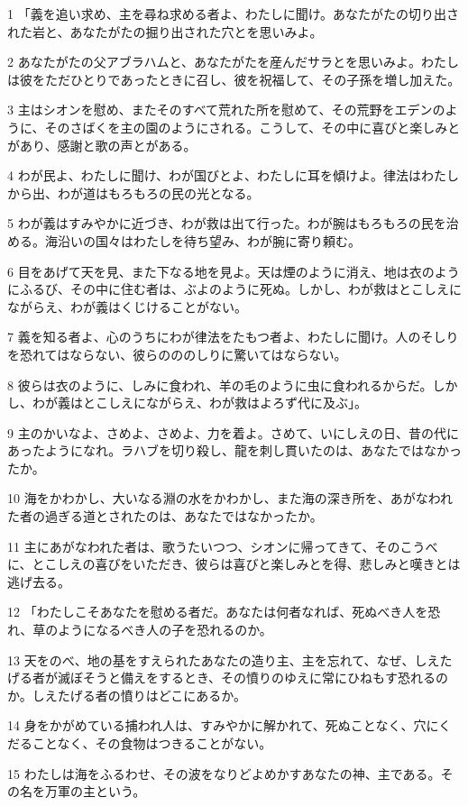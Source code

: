 \par 1 「義を追い求め、主を尋ね求める者よ、わたしに聞け。あなたがたの切り出された岩と、あなたがたの掘り出された穴とを思いみよ。
\par 2 あなたがたの父アブラハムと、あなたがたを産んだサラとを思いみよ。わたしは彼をただひとりであったときに召し、彼を祝福して、その子孫を増し加えた。
\par 3 主はシオンを慰め、またそのすべて荒れた所を慰めて、その荒野をエデンのように、そのさばくを主の園のようにされる。こうして、その中に喜びと楽しみとがあり、感謝と歌の声とがある。
\par 4 わが民よ、わたしに聞け、わが国びとよ、わたしに耳を傾けよ。律法はわたしから出、わが道はもろもろの民の光となる。
\par 5 わが義はすみやかに近づき、わが救は出て行った。わが腕はもろもろの民を治める。海沿いの国々はわたしを待ち望み、わが腕に寄り頼む。
\par 6 目をあげて天を見、また下なる地を見よ。天は煙のように消え、地は衣のようにふるび、その中に住む者は、ぶよのように死ぬ。しかし、わが救はとこしえにながらえ、わが義はくじけることがない。
\par 7 義を知る者よ、心のうちにわが律法をたもつ者よ、わたしに聞け。人のそしりを恐れてはならない、彼らのののしりに驚いてはならない。
\par 8 彼らは衣のように、しみに食われ、羊の毛のように虫に食われるからだ。しかし、わが義はとこしえにながらえ、わが救はよろず代に及ぶ」。
\par 9 主のかいなよ、さめよ、さめよ、力を着よ。さめて、いにしえの日、昔の代にあったようになれ。ラハブを切り殺し、龍を刺し貫いたのは、あなたではなかったか。
\par 10 海をかわかし、大いなる淵の水をかわかし、また海の深き所を、あがなわれた者の過ぎる道とされたのは、あなたではなかったか。
\par 11 主にあがなわれた者は、歌うたいつつ、シオンに帰ってきて、そのこうべに、とこしえの喜びをいただき、彼らは喜びと楽しみとを得、悲しみと嘆きとは逃げ去る。
\par 12 「わたしこそあなたを慰める者だ。あなたは何者なれば、死ぬべき人を恐れ、草のようになるべき人の子を恐れるのか。
\par 13 天をのべ、地の基をすえられたあなたの造り主、主を忘れて、なぜ、しえたげる者が滅ぼそうと備えをするとき、その憤りのゆえに常にひねもす恐れるのか。しえたげる者の憤りはどこにあるか。
\par 14 身をかがめている捕われ人は、すみやかに解かれて、死ぬことなく、穴にくだることなく、その食物はつきることがない。
\par 15 わたしは海をふるわせ、その波をなりどよめかすあなたの神、主である。その名を万軍の主という。
